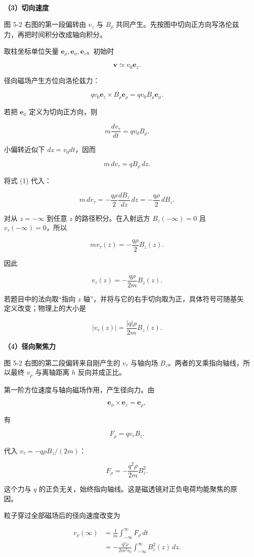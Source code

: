 \documentclass[12pt,a4paper,UTF8]{ctexart}
\begin{document}
\textbf{（3）切向速度}

图 5-2 右图的第一段偏转由 \(v_z\) 与 \(B_\rho\)
共同产生。先按图中切向正方向写洛伦兹力，再把时间积分改成轴向积分。

取柱坐标单位矢量 \(\bm e_\rho,\bm e_\phi,\bm e_z\)。初始时

\[
\bm v\simeq v_0\bm e_z.
\]

径向磁场产生方位向洛伦兹力：

\[
qv_0\bm e_z\times B_\rho\bm e_\rho
=qv_0B_\rho\bm e_\phi.
\]

若把 \(\bm e_\phi\) 定义为切向正方向，则

\[
m\frac{dv_\tau}{dt}=qv_0B_\rho.
\]

小偏转近似下 \(dz=v_0dt\)，因而

\[
m\,dv_\tau=qB_\rho\,dz.
\]

将式 (1) 代入：

\[
m\,dv_\tau
=-\frac{q\rho}{2}\frac{dB_z}{dz}\,dz
=-\frac{q\rho}{2}\,dB_z.
\]

对从 \(z=-\infty\) 到任意 \(z\) 的路径积分。在入射远方
\(B_z(-\infty)=0\) 且 \(v_\tau(-\infty)=0\)，所以

\[
mv_\tau(z)=-\frac{q\rho}{2}B_z(z).
\]

因此

\[
\boxed{v_\tau(z)=-\frac{q\rho}{2m}B_z(z)}.
\]

若题目中的法向取``指向 \(z\)
轴''，并将与它的右手切向取为正，具体符号可随基矢定义改变；物理上的大小是

\[
|v_\tau(z)|=\frac{|q|\rho}{2m}B_z(z).
\]

\textbf{（4）径向聚焦力}

图 5-2 右图的第二段偏转来自刚产生的 \(v_\tau\) 与轴向场
\(B_z\)。两者的叉乘指向轴线，所以最终 \(v_\rho\) 与离轴距离 \(h\)
反向并成正比。

第一阶方位速度与轴向磁场作用，产生径向力。由

\[
\bm e_\phi\times\bm e_z=\bm e_\rho,
\]

有

\[
F_\rho=qv_\tau B_z.
\]

代入 \(v_\tau=-q\rho B_z/(2m)\)：

\[
\boxed{F_\rho=-\frac{q^2\rho}{2m}B_z^2}.
\]

这个力与 \(q\)
的正负无关，始终指向轴线。这是磁透镜对正负电荷均能聚焦的原因。

粒子穿过全部磁场后的径向速度改变为

\[
\begin{aligned}
v_\rho(\infty)
&=\frac1m\int_{-\infty}^{\infty}F_\rho\,dt\\
&=-\frac{q^2\rho}{2m^2v_0}
\int_{-\infty}^{\infty}B_z^2(z)\,dz.
\end{aligned}
\]
\end{document}
